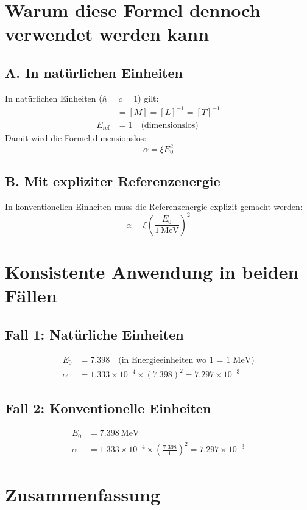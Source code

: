 \documentclass[12pt, a4paper]{article}
\begin{document}
\section*{Warum diese Formel dennoch verwendet werden kann}

\subsection*{A. In natürlichen Einheiten}
In natürlichen Einheiten ($\hbar = c = 1$) gilt:
\begin{align*}
	[E] &= [M] = [L]^{-1} = [T]^{-1} \\
	E_{\text{ref}} &= 1 \quad \text{(dimensionslos)}
\end{align*}
Damit wird die Formel dimensionslos:
\[
\alpha = \xi E_0^2
\]

\subsection*{B. Mit expliziter Referenzenergie}
In konventionellen Einheiten muss die Referenzenergie explizit gemacht werden:
\[
\alpha = \xi \left(\frac{E_0}{\SI{1}{\MeV}}\right)^2
\]

\section*{Konsistente Anwendung in beiden Fällen}

\subsection*{Fall 1: Natürliche Einheiten}
\begin{align*}
	E_0 &= 7.398 \quad \text{(in Energieeinheiten wo 1 = 1 MeV)} \\
	\alpha &= 1.333 \times 10^{-4} \times (7.398)^2 = 7.297 \times 10^{-3}
\end{align*}

\subsection*{Fall 2: Konventionelle Einheiten}
\begin{align*}
	E_0 &= \SI{7.398}{\MeV} \\
	\alpha &= 1.333 \times 10^{-4} \times \left(\frac{7.398}{1}\right)^2 = 7.297 \times 10^{-3}
\end{align*}

\section*{Zusammenfassung}
\end{document}

